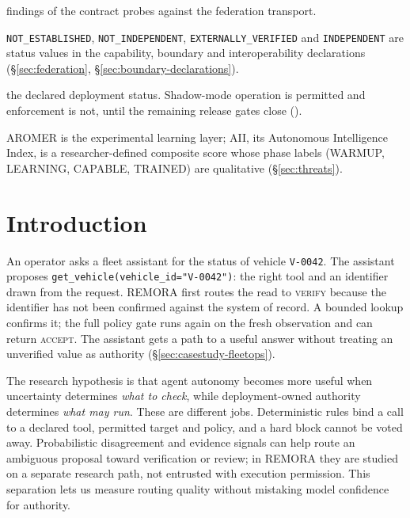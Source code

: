 \documentclass[10pt,twocolumn]{article}
\begin{document}
\begin{description}[leftmargin=1.2em,itemsep=1pt,font=\normalfont\bfseries]
  findings of the contract probes against the federation transport.
\item[Status values] \texttt{NOT\_\allowbreak ESTABLISHED}, \texttt{NOT\_\allowbreak INDEPENDENT},
  \texttt{EXTERNALLY\_\allowbreak VERIFIED} and \texttt{INDEPENDENT} are status values in
  the capability, boundary and interoperability declarations
  (\S\ref{sec:federation}, \S\ref{sec:boundary-declarations}).
\item[SHADOW\_ONLY] the declared deployment status. Shadow-mode operation is
  permitted and enforcement is not, until the remaining release gates close
  ().
\item[AROMER, AII] AROMER is the experimental learning layer; AII, its
  Autonomous Intelligence Index, is a researcher-defined composite score
  whose phase labels (WARMUP, LEARNING, CAPABLE, TRAINED) are qualitative
  (\S\ref{sec:threats}).
\end{description}

\section{Introduction}
\label{sec:intro}

An operator asks a fleet assistant for the status of vehicle
\texttt{V-0042}. The assistant proposes
\texttt{get\_vehicle(vehicle\_id="V-0042")}: the right tool and an
identifier drawn from the request. REMORA first routes the read to
\textsc{verify} because the identifier has not been confirmed against
the system of record. A bounded lookup confirms it; the full policy
gate runs again on the fresh observation and can return \textsc{accept}.
The assistant gets a path to a useful answer without treating an
unverified value as authority (\S\ref{sec:casestudy-fleetops}).

The research hypothesis is that agent autonomy becomes more useful
when uncertainty determines \emph{what to check}, while deployment-owned
authority determines \emph{what may run}. These are different jobs.
Deterministic rules bind a call to a declared tool, permitted target and
policy, and a hard block cannot be voted away. Probabilistic disagreement
and evidence signals can help route an ambiguous proposal toward
verification or review; in REMORA they are studied on a separate research
path, not entrusted with execution permission. This separation lets us
measure routing quality without mistaking model confidence for authority.
\end{document}
